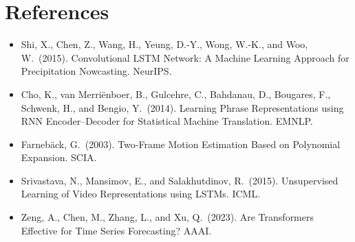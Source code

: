 \documentclass[11pt]{article}
\begin{document}
\section*{References}
\begin{itemize}
\item Shi, X., Chen, Z., Wang, H., Yeung, D.-Y., Wong, W.-K., and Woo, W.\ (2015). Convolutional LSTM Network:
A Machine Learning Approach for Precipitation Nowcasting. NeurIPS.
\item Cho, K., van Merri\"enboer, B., Gulcehre, C., Bahdanau, D., Bougares, F., Schwenk, H., and Bengio, Y.\ (2014).
Learning Phrase Representations using RNN Encoder--Decoder for Statistical Machine Translation. EMNLP.
\item Farneb\"ack, G.\ (2003). Two-Frame Motion Estimation Based on Polynomial Expansion. SCIA.
\item Srivastava, N., Mansimov, E., and Salakhutdinov, R.\ (2015). Unsupervised Learning of Video Representations
using LSTMs. ICML.
\item Zeng, A., Chen, M., Zhang, L., and Xu, Q.\ (2023). Are Transformers Effective for Time Series Forecasting? AAAI.
\end{itemize}
\end{document}
